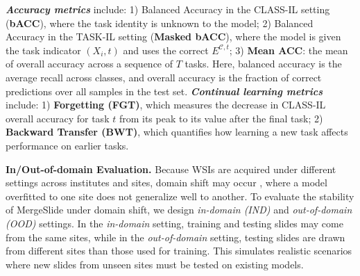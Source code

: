 \documentclass[10pt,twocolumn,letterpaper]{article}
\begin{document}
\begin{table}[]
\caption{\textbf{Comparison between MergeSlide and other continual learning methods on a benchmark of six TCGA datasets in the reversed sequence of \textcolor{red}{C}$\rightarrow$\textcolor{red}{T}$\rightarrow$\textcolor{red}{E}$\rightarrow$\textcolor{blue}{N}$\rightarrow$\textcolor{blue}{R}$\rightarrow$\textcolor{blue}{B}.} p-values between the best-performing method and the others: */**/*** indicate significance at the levels of $p < 0.05$, $p < 0.01$, and $p < 0.001$, respectively. {More results, including macro/weighted F1 and precision/recall/AUC per cancer subtype from this table, are reported in Table H.3 of the Supplementary Material.}}
\label{tab:reverse}
\end{table}

\noindent\textbf{\textit{Accuracy metrics}} include: {1) Balanced Accuracy in the CLASS\mbox{-}IL setting (\textbf{bACC}), where the task identity is unknown to the model; 2) Balanced Accuracy in the TASK\mbox{-}IL setting (\textbf{Masked bACC}), where the model is given the task indicator $(X_i, t)$ and uses the correct $E^{\mathcal{C},t}$;} 3) \textbf{Mean ACC}: the mean of overall accuracy across a sequence of $T$ tasks. {Here, balanced accuracy is the average recall across classes}, and overall accuracy is the fraction of correct predictions over all samples in the test set. \noindent\textbf{\textit{Continual learning metrics}} include: 1) \textbf{Forgetting (FGT)}, which measures the decrease in CLASS\mbox{-}IL overall accuracy for task $t$ from its peak to its value after the final task; 2) \textbf{Backward Transfer (BWT)}, which quantifies how learning a new task affects performance on earlier tasks.

\noindent\textbf{{In/Out-of-domain Evaluation.}} {Because WSIs are acquired under different settings across institutes and sites, domain shift may occur \cite{cheng2021robust}, where a model overfitted to one site does not generalize well to another. To evaluate the stability of MergeSlide under domain shift, we design \textit{in-domain (IND)} and \textit{out-of-domain (OOD)} settings. In the \textit{in-domain} setting, training and testing slides may come from the same sites, while in the \textit{out-of-domain} setting, testing slides are drawn from different sites than those used for training. This simulates realistic scenarios where new slides from unseen sites must be tested on existing models.}
\end{document}
